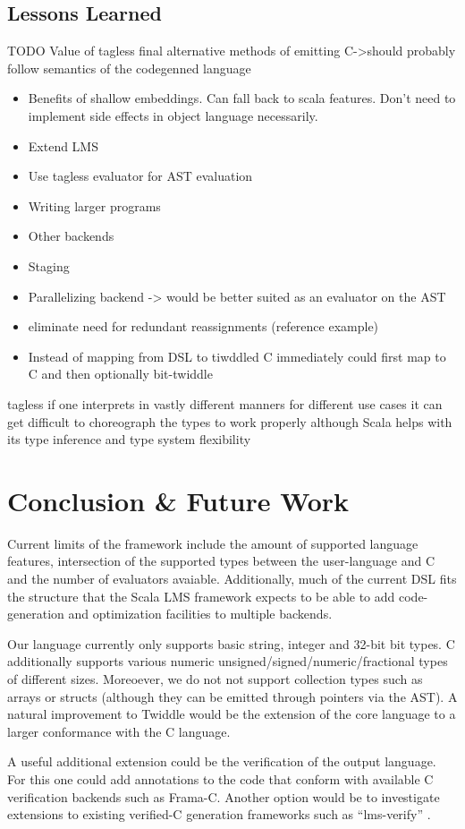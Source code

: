 \documentclass{article}
\begin{document}
\subsection{Lessons Learned}
TODO
Value of tagless final
alternative methods of emitting C->should probably follow semantics of the codegenned language

\begin{itemize}
	\item Benefits of shallow embeddings. Can fall back to scala features. Don't need to implement side effects in object language necessarily.
	\item Extend LMS
	\item Use tagless evaluator for AST evaluation
	\item Writing larger programs
	\item Other backends
	\item Staging
	\item Parallelizing backend -> would be better suited as an evaluator on the AST
	\item eliminate need for redundant reassignments (reference example)
	\item Instead of mapping from DSL to tiwddled C immediately could first map to C and then optionally bit-twiddle
\end{itemize}

tagless if one interprets in vastly different manners for different use cases it can get difficult to choreograph the types to work properly although Scala helps with its type inference and type system flexibility
\section{Conclusion \& Future Work}
Current limits of the framework include the amount of supported language features, intersection of the supported types between the user-language and C and the number of evaluators avaiable. Additionally, much of the current DSL fits the structure
that the Scala LMS framework expects to be able to add code-generation and optimization facilities to multiple backends.

Our language currently only supports basic string, integer and 32-bit bit types. C additionally supports various numeric unsigned/signed/numeric/fractional types of different sizes. Moreoever, we do not not support collection types such as arrays or structs (although they can be emitted through pointers via the AST). A natural improvement to Twiddle would be the extension of the core language
to a larger conformance with the C language.

A useful additional extension could be the verification of the output language. For this one could add annotations to the code that conform with available C verification backends such as Frama-C. Another option would be to investigate extensions to existing verified-C generation frameworks such as ``lms-verify'' \cite{amin2017lms}.



\end{document}
